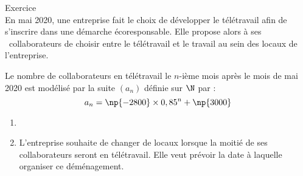 \documentclass[a4paper,11pt,eval]{nsi}
\newcounter{exoNum}
\newcommand{\exo}[1]
{
	\addtocounter{exoNum}{1}
	{\titlefont\color{UGLiBlue}\Large Exercice\ \theexoNum\ \normalsize{#1}}\smallskip	
}
\begin{document}
\newpage
\exo{}\\
En mai 2020, une entreprise fait le choix de développer le télétravail afin de s'inscrire dans une démarche écoresponsable. Elle propose alors à ses ~collaborateurs de choisir entre le télétravail et le travail au sein des locaux de l'entreprise.

Le nombre de collaborateurs en télétravail le $n$-ième mois après le mois de mai 2020 est modélisé par la suite $\left(a_n\right)$ définie sur $\N$ par : $$a_n = \np{- 2800} \times  0,85^n + \np{3000}$$
\begin{enumerate}

    \item {}
    \item L'entreprise souhaite de changer de locaux lorsque la moitié de ses collaborateurs seront en télétravail. Elle veut prévoir la date à laquelle organiser ce déménagement.
\end{enumerate}
\carreauxseyes{16.8cm}{16.8cm}\\
\carreauxseyes{16.8cm}{9.6cm}

\vspace*{1cm}
\end{document}
